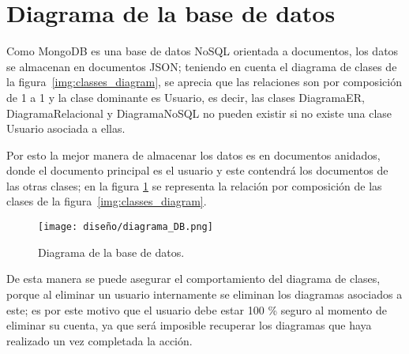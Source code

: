 \section{Diagrama de la base de datos}
Como MongoDB es una base de datos NoSQL orientada a documentos, los datos se almacenan en documentos JSON; teniendo en cuenta el diagrama de clases de la figura~\ref{img:classes_diagram}, se aprecia que las relaciones son por composición de 1 a 1 y la clase dominante es Usuario, es decir, las clases DiagramaER, DiagramaRelacional y DiagramaNoSQL no pueden existir si no existe una clase Usuario asociada a ellas.


Por esto la mejor manera de almacenar los datos es en documentos anidados, donde el documento principal es el usuario y este contendrá los documentos de las otras clases; en la figura \ref{img:database_schema} se representa la relación por composición de las clases de la figura~\ref{img:classes_diagram}.


\begin{figure}[H]
    \centering
    \texttt{[image: diseño/diagrama\_DB.png]}
    \caption{Diagrama de la base de datos.}
    \label{img:database_schema}
\end{figure}


De esta manera se puede asegurar el comportamiento del diagrama de clases, porque al eliminar un usuario internamente se eliminan los diagramas asociados a este; es por este motivo que el usuario debe estar 100 \% seguro al momento de eliminar su cuenta, ya que será imposible recuperar los diagramas que haya realizado un vez completada la acción.